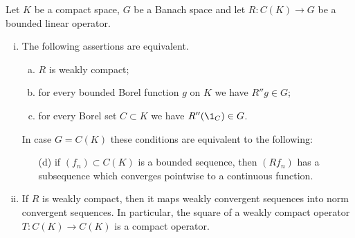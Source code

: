 \begin{proposition}\label{prop:b4-2.4}
	Let $K$ be a compact space, $G$ be a Banach space
	and let $R \colon C(K) \to G$ be a bounded linear operator.
	
	\begin{enumerate}[(i)]
		\item
		The following assertions are equivalent.
		\begin{enumerate}[(a)]
		\item 
		$R$ is weakly compact;
	
		\item 
		for every bounded Borel function $g$ on $K$ we have $R''g \in G$;
	
		\item 
		for every Borel set $C \subset K$ we have $R''(\1_C) \in G$.
		\end{enumerate}
%
%
%
\newpage
%
In case $G = C(K)$ these conditions are equivalent to the following:
	\begin{enumerate}
	\item[(d)] 
	if $(f_n) \subset C(K)$ is a bounded sequence, then $(Rf_n)$ has a subsequence which converges pointwise to a continuous function.
    \end{enumerate}
	\item 
	If $R$ is weakly compact, then it maps weakly convergent sequences into norm convergent sequences.
	In particular, the square of a weakly
	compact operator $T : C(K) \to C(K)$ is a compact operator.
\end{enumerate}
\end{proposition}

